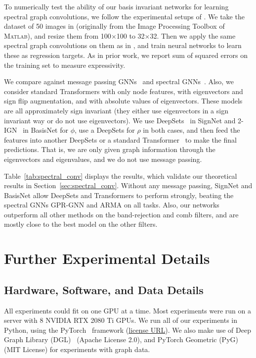 \documentclass{article} \usepackage{iclr2023_conference,times}
\begin{document}
To numerically test the ability of our basis invariant networks for learning spectral graph convolutions, we follow the experimental setups of \cite{balcilar2020analyzing, he2021bernnet}. We take the dataset of 50 images in \cite{he2021bernnet} (originally from the Image Processing Toolbox of \textsc{Matlab}), and resize them from 100$\times$100 to 32$\times$32. Then we apply the same spectral graph convolutions on them as in \cite{he2021bernnet}, and train neural networks to learn these as regression targets. As in prior work, we report sum of squared errors on the training set to measure expressivity.

We compare against message passing GNNs~\citep{kipf2016semi,velivckovic2018graph} and spectral GNNs~\citep{chien2021adaptive,bianchi2021graph,defferrard2016convolutional,he2021bernnet}. Also, we consider standard Transformers with only node features, with eigenvectors and sign flip augmentation, and with absolute values of eigenvectors. These models are all approximately sign invariant (they either use eigenvectors in a sign invariant way or do not use eigenvectors). We use DeepSets~\citep{zaheer2017deep} in SignNet and 2-IGN~\citep{maron2018invariant} in BasisNet for $\phi$, use a DeepSets for $\rho$ in both cases, and then feed the features into another DeepSets or a standard Transformer~\citep{vaswani2017attention} to make the final predictions. That is, we are only given graph information through the eigenvectors and eigenvalues, and we do not use message passing.

Table~\ref{tab:spectral_conv} displays the results, which validate our theoretical results in Section~\ref{sec:spectral_conv}. Without any message passing, SignNet and BasisNet allow DeepSets and Transformers to perform strongly, beating the spectral GNNs GPR-GNN and ARMA on all tasks. Also, our networks outperform all other methods on the band-rejection and comb filters, and are mostly close to the best model on the other filters. 

\section{Further Experimental Details}

\subsection{Hardware, Software, and Data Details}\label{appendix:other_exp_details}

All experiments could fit on one GPU at a time. Most experiments were run on a server with 8 NVIDIA RTX 2080 Ti GPUs. We run all of our experiments in Python, using the PyTorch~\citep{paszke2019pytorch} framework (\href{https://github.com/pytorch/pytorch/blob/master/LICENSE}{license URL}). We also make use of Deep Graph Library (DGL)~\citep{wang2019deep} (Apache License 2.0), and PyTorch Geometric (PyG)~\citep{fey2019fast} (MIT License) for experiments with graph data.
\end{document}
